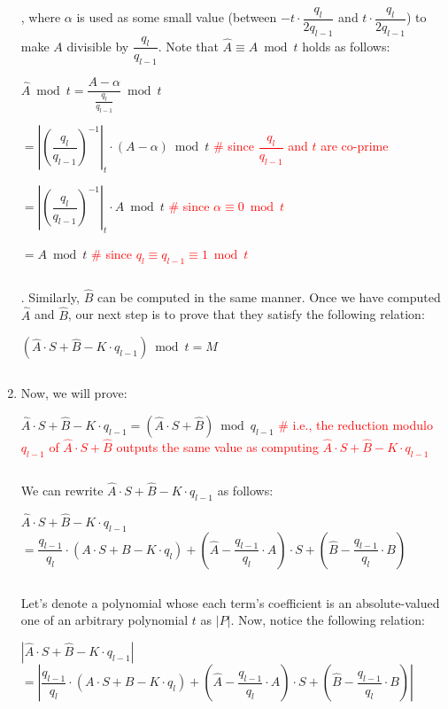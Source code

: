 \begin{myproof}
\begin{enumerate}
$ $

$ $

, where $\alpha$ is used as some small value (between $-t\cdot\dfrac{q_l}{2q_{l-1}}$ and $t\cdot\dfrac{q_l}{2q_{l-1}}$) to make $A$ divisible by $\dfrac{q_l}{q_{l-1}}$. Note that $\hat{A} \equiv A \bmod t$ holds as follows:

$\hat{A} \bmod t = \dfrac{A - \alpha}{\frac{q_l}{q_{l-1}}} \bmod t$

$ = \left|\left(\dfrac{q_{l}}{q_{l-1}}\right)^{-1}\right|_{t} \cdot (A - \alpha) \bmod t$ 
\textcolor{red}{ \# since $\dfrac{q_{l}}{q_{l-1}}$ and $t$ are co-prime}

$ = \left|\left(\dfrac{q_{l}}{q_{l-1}}\right)^{-1}\right|_{t} \cdot A \bmod t$ 
\textcolor{red}{ \# since $\alpha \equiv 0 \bmod t$}

$ = A \bmod t$ 
\textcolor{red}{ \# since $q_l \equiv q_{l-1} \equiv 1 \bmod t$}

$ $

. Similarly, $\hat{B}$ can be computed in the same manner. Once we have computed $\hat{A}$ and $\hat{B}$, our next step is to prove that they satisfy the following relation: 

$(\hat A\cdot S+ \hat B - K\cdot q_{l-1}) \bmod t = M$ 

$ $

\item Now, we will prove: 

$\hat A\cdot S + \hat B - K\cdot q_{l-1} = (\hat A\cdot S + \hat B) \bmod q_{l-1}$ \textcolor{red}{ \# i.e., the reduction modulo $q_{l-1}$ of $\hat A\cdot S + \hat B$ outputs the same value as computing $\hat A\cdot S + \hat B - K\cdot q_{l-1}$}

$ $

We can rewrite $\hat A\cdot S + \hat B - K\cdot q_{l-1}$ as follows:

$\hat A\cdot S + \hat B - K\cdot q_{l-1}$
$= \dfrac{q_{l-1}}{q_l}\cdot (A\cdot S+ B - K\cdot q_l) + (\hat A - \dfrac{q_{l-1}}{q_l}\cdot A)\cdot S + (\hat B - \dfrac{q_{l-1}}{q_l}\cdot B)$

$ $

Let's denote a polynomial whose each term's coefficient is an absolute-valued one of an arbitrary polynomial $t$ as $|P|$. Now, notice the following relation:

$|\hat A\cdot S + \hat B - K\cdot q_{l-1}|$   
$= \left|\dfrac{q_{l-1}}{q_l}\cdot (A\cdot S+ B - K\cdot q_l) + (\hat A - \dfrac{q_{l-1}}{q_l}\cdot A)\cdot S + (\hat B - \dfrac{q_{l-1}}{q_l}\cdot B)\right|$


\end{enumerate}
\end{myproof}
